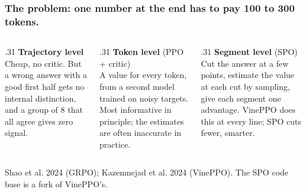 \documentclass[aspectratio=169,11pt]{beamer}
\newcommand{\source}[1]{\vfill{\scriptsize\color{Gray}#1\par}}
\begin{document}
\begin{frame}[t]
\frametitle{The problem: one number at the end has to pay 100 to 300 tokens.}
\begin{center}
\end{center}
\vspace{-1mm}
\begin{columns}[T,onlytextwidth]
\begin{column}{.31\textwidth}
\textbf{Trajectory level}\\[1mm]
Cheap, no critic. But a wrong answer with a good first half gets no internal distinction,
and a group of 8 that all agree gives zero signal.
\end{column}
\begin{column}{.31\textwidth}
\textbf{Token level} (PPO + critic)\\[1mm]
A value for every token, from a second model trained on noisy targets. Most informative in
principle; the estimates are often inaccurate in practice.
\end{column}
\begin{column}{.31\textwidth}
\textbf{Segment level} (SPO)\\[1mm]
Cut the answer at a few points, estimate the value at each cut by sampling, give each
segment one advantage. VinePPO does this at every line; SPO cuts fewer, smarter.
\end{column}
\end{columns}
\source{Shao et al. 2024 (GRPO); Kazemnejad et al. 2024 (VinePPO). The SPO code base is a fork of VinePPO's.}
\end{frame}
\end{document}
